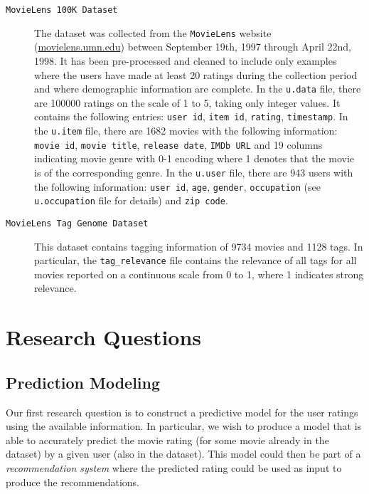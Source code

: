 \documentclass[bj, preprint]{imsart}
\begin{document}
\begin{description}
	\item[\texttt{MovieLens 100K Dataset}] 
	The dataset was collected from the \texttt{MovieLens} website (\url{movielens.umn.edu}) between September 19th, 1997 through April 22nd, 1998. 
	It has been pre-processed and cleaned to include only examples where the users have made at least 20 ratings during the collection period and where demographic information are complete. 
	In the \texttt{u.data} file, there are \num{100000} ratings on the scale of 1 to 5, taking only integer values. 
	It contains the following entries: \texttt{user id}, \texttt{item id}, \texttt{rating}, \texttt{timestamp}. 
	In the \texttt{u.item} file, there are \num{1682} movies with the following information: \texttt{movie id}, \texttt{movie title}, \texttt{release date}, \texttt{IMDb URL} and 19 columns indicating movie genre with 0-1 encoding where 1 denotes that the movie is of the corresponding genre. 
	In the \texttt{u.user} file, there are \num{943} users with the following information: \texttt{user id}, \texttt{age}, \texttt{gender}, \texttt{occupation} (see \texttt{u.occupation} file for details) and \texttt{zip code}.
	\item[\texttt{MovieLens Tag Genome Dataset}] 
	This dataset contains tagging information of \num{9734} movies and \num{1128} tags. 
	In particular, the \texttt{tag\_relevance} file contains the relevance of all tags for all movies reported on a continuous scale from 0 to 1, where 1 indicates strong relevance.
\end{description}


\section{Research Questions}\label{sec:questions}

\subsection{Prediction Modeling}

Our first research question is to construct a predictive model for the user ratings using the available information. In particular, we wish to produce a model that is able to accurately predict the movie rating (for some movie already in the dataset) by a given user (also in the dataset). This model could then be part of a \textit{recommendation system} where the predicted rating could be used as input to produce the recommendations.
\end{document}
